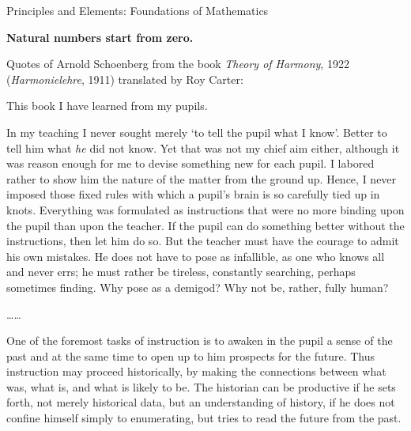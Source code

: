 \documentclass[12pt]{article}
\begin{document}
\abovedisplayskip=3pt
\abovedisplayskip

\leavevmode

{\centering
Principles and Elements: Foundations of Mathematics

}

\leavevmode

\hspace{-0.75in} \textbf{Natural numbers start from zero.}

\leavevmode

Quotes of Arnold Schoenberg from the book \emph{Theory of Harmony}, 1922 (\emph{Harmonielehre}, 1911) translated by Roy Carter:

\begin{mdframed}

This book I have learned from my pupils.

In my teaching I never sought merely `to tell the pupil what I know'. Better to tell him what \emph{he} did not know. Yet that was not my chief aim either, although it was reason enough for me to devise something new for each pupil. I labored rather to show him the nature of the matter from the ground up. Hence, I never imposed those fixed rules with which a pupil's brain is so carefully tied up in knots. Everything was formulated as instructions that were no more binding upon the pupil than upon the teacher. If the pupil can do something better without the instructions, then let him do so. But the teacher must have the courage to admit his own mistakes. He does not have to pose as infallible, as one who knows all and never errs; he must rather be tireless, constantly searching, perhaps sometimes finding. Why pose as a demigod? Why not be, rather, fully human?

\ldots\ldots{}

One of the foremost tasks of instruction is to awaken in the pupil a sense of the past and at the same time to open up to him prospects for the future. Thus instruction may proceed historically, by making the connections between what was, what is, and what is likely to be. The historian can be productive if he sets forth, not merely historical data, but an understanding of history, if he does not confine himself simply to enumerating, but tries to read the future from the past.


\end{mdframed}
\end{document}
